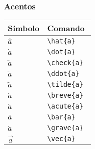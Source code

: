 \documentclass[brazilian]{beamer}
\begin{document}
\begin{frame}[fragile]
    \frametitle{Acentos}

    \begin{table}
        \begin{tabular}{O{1.5cm}l}
            Símbolo & Comando \\ \hline
            \(\hat{a} \) & \lstinline[style=myStyleLatex]!\hat{a} ! \\ \hline
            \(\dot{a} \) & \lstinline[style=myStyleLatex]!\dot{a} ! \\ \hline
            \(\check{a} \) & \lstinline[style=myStyleLatex]!\check{a} ! \\ \hline
            \(\ddot{a} \) & \lstinline[style=myStyleLatex]!\ddot{a} ! \\ \hline
            \(\tilde{a} \) & \lstinline[style=myStyleLatex]!\tilde{a} ! \\ \hline
            \(\breve{a} \) & \lstinline[style=myStyleLatex]!\breve{a} ! \\ \hline
            \(\acute{a} \) & \lstinline[style=myStyleLatex]!\acute{a} ! \\ \hline
            \(\bar{a} \) & \lstinline[style=myStyleLatex]!\bar{a} ! \\ \hline
            \(\grave{a} \) & \lstinline[style=myStyleLatex]!\grave{a} ! \\ \hline
            \(\vec{a} \) & \lstinline[style=myStyleLatex]!\vec{a} ! \\ \hline            
        \end{tabular}
    \end{table}

\end{frame}
\end{document}
